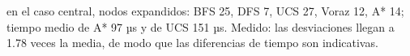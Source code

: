 {en el caso central, nodos expandidos: BFS 25, DFS 7, UCS 27, Voraz 12, A* 14; tiempo medio de A* 97 µs y de UCS 151 µs.}
{Medido: las desviaciones llegan a 1.78 veces la media, de modo que las diferencias de tiempo son indicativas.}
